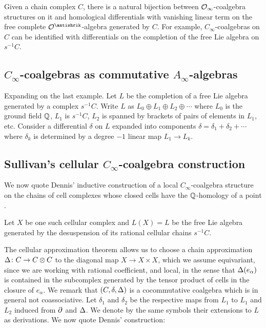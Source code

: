Given a chain complex $C$, there is a natural bijection between $\mathcal{O}_\infty$-coalgebra structures on it and homological differentials with vanishing linear term on the free complete $\cO^\antishrik$-algebra generated by $C$.
For example, $C_\infty$-coalgebras on $C$ can be identified with differentials on the completion of the free Lie algebra on $s^{-1} C$.

\subsection{$C_\infty$-coalgebras as commutative $A_\infty$-algebras}

Expanding on the last example.
Let $L$ be the completion of a free Lie algebra generated by a complex $s^{-1}C$.
Write $L$ as $L_0 \oplus L_1 \oplus L_2 \oplus \dotsb $ where $L_0$ is the ground field $\mathbb{Q}$, $L_1$ is $s^{-1}C$, $L_2$ is spanned by brackets of pairs of elements in $L_1$, etc.
Consider a differential $\delta$ on $L$ expanded into components $\delta = \delta_1 + \delta_2 + \dotsb$ where $\delta_k$ is determined by a degree $-1$ linear map $L_1 \to L_k$.


\subsection{Sullivan's cellular $C_\infty$-coalgebra construction} \label{ss:dennis construction}

We now quote Dennis' inductive construction of a local $C_\infty$-coalgebra structure on the chains of cell complexes whose closed cells have the $\mathbb{Q}$-homology of a point \cite{sullivan2007appendix}.

Let $X$ be one such cellular complex and $L(X) = L$ be the free Lie algebra generated by the desuspension of its rational cellular chains $s^{-1}C$.

The cellular approximation theorem allows us to choose a chain approximation $\operatorname{\Delta} \colon C \to C \otimes C$ to the diagonal map $X \to X \times X$, which we assume equivariant, since we are working with rational coefficient, and local, in the sense that $\operatorname{\Delta}(e_\alpha)$ is contained in the subcomplex generated by the tensor product of cells in the closure of $e_\alpha$.
We remark that $(C, \delta, \operatorname{\Delta})$ is a cocommutative coalgebra which is in general not coassociative.
Let $\delta_1$ and $\delta_2$ be the respective maps from $L_1$ to $L_1$ and $L_2$ induced from $\partial$ and $\operatorname{\Delta}$.
We denote by the same symbols their extensions to $L$ as derivations.
We now quote Dennis' construction:

